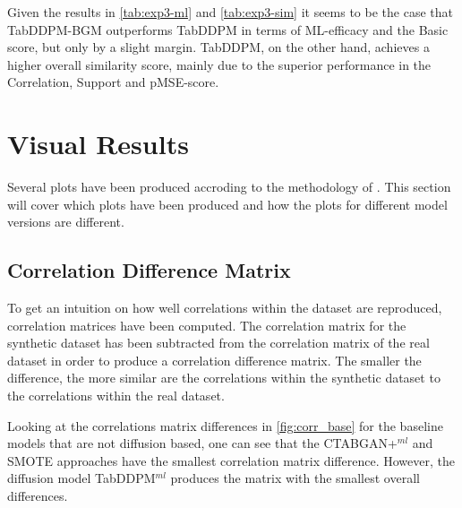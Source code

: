 Given the results in \autoref{tab:exp3-ml} and \autoref{tab:exp3-sim} it seems to be the case that TabDDPM-BGM outperforms TabDDPM in terms of ML-efficacy and the Basic score, but only by a slight margin.
TabDDPM, on the other hand, achieves a higher overall similarity score, mainly due to the superior performance in the Correlation, Support and pMSE-score.


\section{Visual Results}
\label{ch:results-Visual}

Several plots have been produced accroding to the methodology of \cite{brenninkmeijer2019GenerationEvaluationTabular}.
This section will cover which plots have been produced and how the plots for different model versions are different.

\subsection[]{Correlation Difference Matrix}

To get an intuition on how well correlations within the dataset are reproduced, correlation matrices have been computed.
The correlation matrix for the synthetic dataset has been subtracted from the correlation matrix of the real dataset in order to produce a correlation difference matrix.
The smaller the difference, the more similar are the correlations within the synthetic dataset to the correlations within the real dataset.

Looking at the correlations matrix differences in \autoref{fig:corr_base} for the baseline models that are not diffusion based, one can see that the CTABGAN+$^{ml}$ and SMOTE approaches have the smallest
correlation matrix difference.
However, the diffusion model TabDDPM$^{ml}$ produces the matrix with the smallest overall differences.

